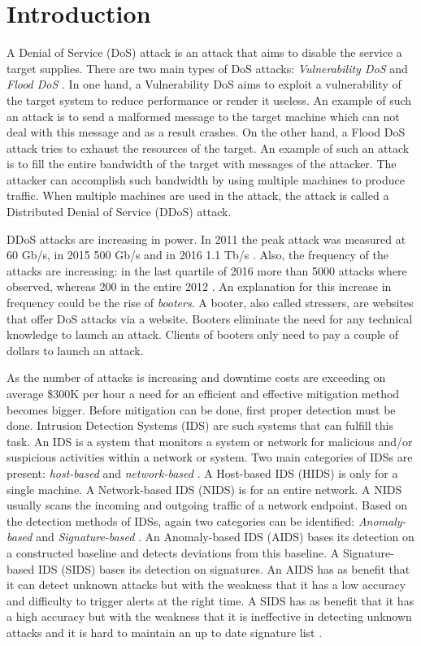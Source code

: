 \section{Introduction} \label{sec:introduction}
A Denial of Service (DoS) attack is an attack that aims to disable the service a target supplies. There are two main types of DoS attacks: \textit{Vulnerability DoS} and \textit{Flood DoS} \cite{Lin2013}. In one hand, a Vulnerability DoS aims to exploit a vulnerability of the target system to reduce performance or render it useless. An example of such an attack is to send a malformed message to the target machine which can not deal with this message and as a result crashes. On the other hand, a Flood DoS attack tries to exhaust the resources of the target. An example of such an attack is to fill the entire bandwidth of the target with messages of the attacker. The attacker can accomplish such bandwidth by using multiple machines to produce traffic. When multiple machines are used in the attack, the attack is called a Distributed Denial of Service (DDoS) attack.  

DDoS attacks are increasing in power. In 2011 the peak attack was measured at 60 Gb/s, in 2015 500 Gb/s and in 2016 1.1 Tb/s \cite{Santana2017}. Also, the frequency of the attacks are increasing: in the last quartile of 2016 more than 5000 attacks where observed, whereas 200 in the entire 2012 \cite{Santana2017}. An explanation for this increase in frequency could be the rise of \textit{booters}. A booter, also called stressers, are websites that offer DoS attacks via a website. Booters eliminate the need for any technical knowledge to launch an attack. Clients of booters only need to pay a couple of dollars to launch an attack.

As the number of attacks is increasing and downtime costs are exceeding on average \$300K per hour \cite{ITIC2016} a need for an efficient and effective mitigation method becomes bigger. Before mitigation can be done, first proper detection must be done. Intrusion Detection Systems (IDS) are such systems that can fulfill this task. An IDS is a system that monitors a system or network for malicious and/or suspicious activities within a network or system. Two main categories of IDSs are present: \textit{host-based} and \textit{network-based} \cite{Fallahi2016}. A Host-based IDS (HIDS) is only for a single machine. A Network-based IDS (NIDS) is for an entire network. A NIDS usually scans the incoming and outgoing traffic of a network endpoint. Based on the detection methods of IDSs, again two categories can be identified: \textit{Anomaly-based} and \textit{Signature-based} \cite{fragkiadakis2015anomaly}. An Anomaly-based IDS (AIDS) bases its detection on a constructed baseline and detects deviations from this baseline. A Signature-based IDS (SIDS) bases its detection on signatures. An AIDS has as benefit that it can detect unknown attacks but with the weakness that it has a low accuracy and difficulty to trigger alerts at the right time. A SIDS has as benefit that it has a high accuracy but with the weakness that it is ineffective in detecting unknown attacks and it is hard to maintain an up to date signature list \cite{Liao2013}. 

